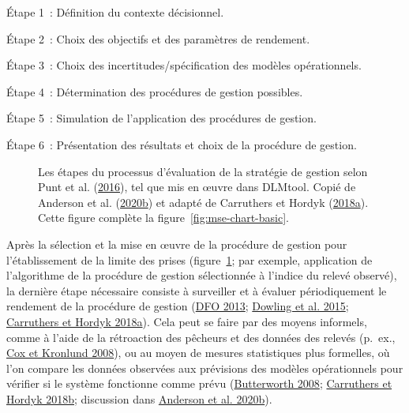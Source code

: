 \documentclass[french,11pt]{book}
\begin{document}
Étape 1~: Définition du contexte décisionnel.

Étape 2~: Choix des objectifs et des paramètres de rendement.

Étape 3~: Choix des incertitudes/spécification des modèles opérationnels.

Étape 4~: Détermination des procédures de gestion possibles.

Étape 5~: Simulation de l'application des procédures de gestion.

Étape 6~: Présentation des résultats et choix de la procédure de gestion.

\clearpage
\begin{figure}[htb]

{\centering {} 

}

\caption{Les étapes du processus d'évaluation de la stratégie de gestion selon Punt et al. (\protect\hyperlink{ref-punt2016}{2016}), tel que mis en œuvre dans DLMtool. Copié de Anderson et al. (\protect\hyperlink{ref-anderson2020gfmp}{2020b}) et adapté de Carruthers et Hordyk (\protect\hyperlink{ref-carruthers2018}{2018a}). Cette figure complète la figure~\ref{fig:mse-chart-basic}.}\label{fig:mse-chart}
\end{figure}
Après la sélection et la mise en œuvre de la procédure de gestion pour l'établissement de la limite des prises (figure~\ref{fig:mse-chart}; par exemple, application de l'algorithme de la procédure de gestion sélectionnée à l'indice du relevé observé), la dernière étape nécessaire consiste à surveiller et à évaluer périodiquement le rendement de la procédure de gestion (\protect\hyperlink{ref-dfo2013}{DFO 2013}; \protect\hyperlink{ref-dowling2015a}{Dowling et al. 2015}; \protect\hyperlink{ref-carruthers2018}{Carruthers et Hordyk 2018a}). Cela peut se faire par des moyens informels, comme à l'aide de la rétroaction des pêcheurs et des données des relevés (p.~ex., \protect\hyperlink{ref-cox2008a}{Cox et Kronlund 2008}), ou au moyen de mesures statistiques plus formelles, où l'on compare les données observées aux prévisions des modèles opérationnels pour vérifier si le système fonctionne comme prévu (\protect\hyperlink{ref-butterworth2008}{Butterworth 2008}; \protect\hyperlink{ref-carruthers_hordyk_2018}{Carruthers et Hordyk 2018b}; discussion dans \protect\hyperlink{ref-anderson2020gfmp}{Anderson et al. 2020b}).
\end{document}
